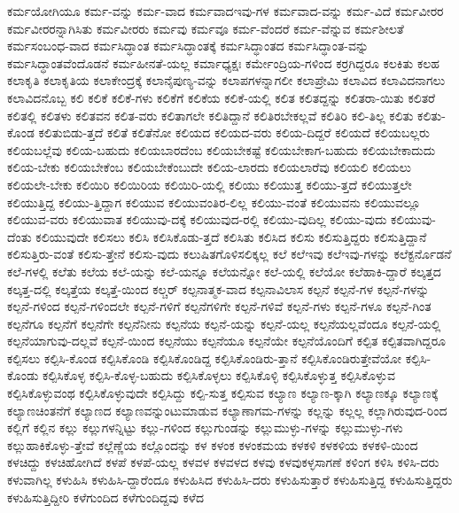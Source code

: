 {ಕರ್ಮಯೋಗಿಯೂ
ಕರ್ಮ-ವನ್ನು
ಕರ್ಮ-ವಾದ
ಕರ್ಮವಾದಇವು-ಗಳ
ಕರ್ಮವಾದ-ವನ್ನು
ಕರ್ಮ-ವಿದೆ
ಕರ್ಮವೀರರ
ಕರ್ಮವೀರರನ್ನಾಗಿಸಿತು
ಕರ್ಮವೀರರು
ಕರ್ಮವು
ಕರ್ಮವೂ
ಕರ್ಮ-ವೆಂದರೆ
ಕರ್ಮ-ವೆನ್ನುವ
ಕರ್ಮಶೀಲತೆ
ಕರ್ಮಸಂಬಂಧ-ವಾದ
ಕರ್ಮಸಿದ್ಧಾಂತ
ಕರ್ಮಸಿದ್ಧಾಂತಕ್ಕೆ
ಕರ್ಮಸಿದ್ಧಾಂತದ
ಕರ್ಮಸಿದ್ಧಾಂತ-ವನ್ನು
ಕರ್ಮಸಿದ್ಧಾಂತವೆಂದೊಡನೆ
ಕರ್ಮಹೀನತೆ-ಯಲ್ಲ
ಕರ್ಮಾಧ್ಯಕ್ಷಃ
ಕರ್ಮೇಂದ್ರಿಯ-ಗಳಿಂದ
ಕರ್ರಗಿದ್ದರೂ
ಕಲಕಿತು
ಕಲಹ
ಕಲಾಕೃತಿ
ಕಲಾಕೃತಿಯ
ಕಲಾಕೇಂದ್ರಕ್ಕೆ
ಕಲಾನೈಪುಣ್ಯ-ವನ್ನು
ಕಲಾಪಗಳನ್ನಾಗಲೀ
ಕಲಾಪ್ರೇಮಿ
ಕಲಾವಿದ
ಕಲಾವಿದನಾಗಲು
ಕಲಾವಿದನೊಬ್ಬ
ಕಲಿ
ಕಲಿಕೆ
ಕಲಿಕೆ-ಗಳು
ಕಲಿಕೆಗೆ
ಕಲಿಕೆಯ
ಕಲಿಕೆ-ಯಲ್ಲಿ
ಕಲಿತ
ಕಲಿತದ್ದನ್ನು
ಕಲಿತರಾ-ಯಿತು
ಕಲಿತರೆ
ಕಲಿತಲ್ಲಿ
ಕಲಿತಳು
ಕಲಿತವನ
ಕಲಿತ-ವರು
ಕಲಿತಾಗಲೇ
ಕಲಿತಿದ್ದಾನೆ
ಕಲಿತಿರಬೇಕಲ್ಲವೆ
ಕಲಿತಿರಿ
ಕಲಿ-ತಿಲ್ಲ
ಕಲಿತು
ಕಲಿತು-ಕೊಂಡ
ಕಲಿತುಬಿಡು-ತ್ತದೆ
ಕಲಿತೆ
ಕಲಿತೆನೋ
ಕಲಿಯದ
ಕಲಿಯದ-ವರು
ಕಲಿಯ-ದಿದ್ದರೆ
ಕಲಿಯದೆ
ಕಲಿಯಬಲ್ಲರು
ಕಲಿಯಬಲ್ಲೆವು
ಕಲಿಯ-ಬಹುದು
ಕಲಿಯಬಾರದೆಂಬ
ಕಲಿಯಬೇಕಷ್ಟೆ
ಕಲಿಯಬೇಕಾಗ-ಬಹುದು
ಕಲಿಯಬೇಕಾದುದು
ಕಲಿಯ-ಬೇಕು
ಕಲಿಯಬೇಕೆಂಬ
ಕಲಿಯಬೇಕೆಂಬುದೇ
ಕಲಿಯ-ಲಾರದು
ಕಲಿಯಲಾರೆವು
ಕಲಿಯಲಿ
ಕಲಿಯಲು
ಕಲಿಯಲೇ-ಬೇಕು
ಕಲಿಯಿರಿ
ಕಲಿಯಿರಿಯ
ಕಲಿಯಿರಿ-ಯಲ್ಲಿ
ಕಲಿಯು
ಕಲಿಯುತ್ತ
ಕಲಿಯು-ತ್ತದೆ
ಕಲಿಯುತ್ತಲೇ
ಕಲಿಯುತ್ತಿದ್ದ
ಕಲಿಯು-ತ್ತಿದ್ದಾಗ
ಕಲಿಯುವ
ಕಲಿಯುವಂತಿರ-ಲಿಲ್ಲ
ಕಲಿಯು-ವಂತೆ
ಕಲಿಯುವನು
ಕಲಿಯುವಲ್ಲೂ
ಕಲಿಯುವ-ವರು
ಕಲಿಯುವಾತ
ಕಲಿಯುವು-ದಕ್ಕೆ
ಕಲಿಯುವುದ-ರಲ್ಲಿ
ಕಲಿಯು-ವುದಿಲ್ಲ
ಕಲಿಯು-ವುದು
ಕಲಿಯುವು-ದೆಂತು
ಕಲಿಯುವುದೇ
ಕಲಿಸಲು
ಕಲಿಸಿ
ಕಲಿಸಿಕೊಡು-ತ್ತದೆ
ಕಲಿಸಿತು
ಕಲಿಸಿದ
ಕಲಿಸು
ಕಲಿಸುತ್ತಿದ್ದರು
ಕಲಿಸುತ್ತಿದ್ದಾನೆ
ಕಲಿಸುತ್ತಿರು-ವಂತೆ
ಕಲಿಸು-ತ್ತೇನೆ
ಕಲಿಸು-ವುದು
ಕಲುಷಿತಗೊಳಿಸಲಿಕ್ಕಲ್ಲ
ಕಲೆ
ಕಲೆಇವು
ಕಲೆಇವು-ಗಳನ್ನು
ಕಲೆಕ್ಟರ್ನೊಡನೆ
ಕಲೆ-ಗಳಲ್ಲಿ
ಕಲೆತು
ಕಲೆಯ
ಕಲೆ-ಯನ್ನು
ಕಲೆ-ಯನ್ನೂ
ಕಲೆಯನ್ನೋ
ಕಲೆ-ಯಲ್ಲಿ
ಕಲೆಯೋ
ಕಲೆಹಾಕಿ-ದ್ದಾರೆ
ಕಲ್ಕತ್ತದ
ಕಲ್ಕತ್ತ-ದಲ್ಲಿ
ಕಲ್ಕತ್ತೆಯ
ಕಲ್ಕತ್ತೆ-ಯಿಂದ
ಕಲ್ಚರ್
ಕಲ್ಪನಾತ್ಮಕ-ವಾದ
ಕಲ್ಪನಾವಿಲಾಸ
ಕಲ್ಪನೆ
ಕಲ್ಪನೆ-ಗಳ
ಕಲ್ಪನೆ-ಗಳನ್ನು
ಕಲ್ಪನೆ-ಗಳಿಂದ
ಕಲ್ಪನೆ-ಗಳಿಂದಲೇ
ಕಲ್ಪನೆ-ಗಳಿಗೆ
ಕಲ್ಪನೆಗಳಿಗೇ
ಕಲ್ಪನೆ-ಗಳಿವೆ
ಕಲ್ಪನೆ-ಗಳು
ಕಲ್ಪನೆ-ಗಳೂ
ಕಲ್ಪನೆ-ಗಿಂತ
ಕಲ್ಪನೆಗೂ
ಕಲ್ಪನೆಗೆ
ಕಲ್ಪನೆಗೇ
ಕಲ್ಪನೆನೀನು
ಕಲ್ಪನೆಯ
ಕಲ್ಪನೆ-ಯನ್ನು
ಕಲ್ಪನೆ-ಯಲ್ಲ
ಕಲ್ಪನೆಯಲ್ಲವೆಂದೂ
ಕಲ್ಪನೆ-ಯಲ್ಲಿ
ಕಲ್ಪನೆಯಾಗುವು-ದಲ್ಲವೆ
ಕಲ್ಪನೆ-ಯಿಂದ
ಕಲ್ಪನೆಯು
ಕಲ್ಪನೆಯೂ
ಕಲ್ಪನೆಯೇ
ಕಲ್ಪನೆಯೊಂದಿಗೆ
ಕಲ್ಪಿತ
ಕಲ್ಪಿತವಾಗಿದ್ದರೂ
ಕಲ್ಪಿಸಲು
ಕಲ್ಪಿಸಿ-ಕೊಂಡ
ಕಲ್ಪಿಸಿಕೊಂಡಿ
ಕಲ್ಪಿಸಿಕೊಂಡಿದ್ದ
ಕಲ್ಪಿಸಿಕೊಂಡಿರು-ತ್ತಾನೆ
ಕಲ್ಪಿಸಿಕೊಂಡಿರುತ್ತೇವೆಯೋ
ಕಲ್ಪಿಸಿ-ಕೊಂಡು
ಕಲ್ಪಿಸಿಕೊಳ್ಳ
ಕಲ್ಪಿಸಿ-ಕೊಳ್ಳ-ಬಹುದು
ಕಲ್ಪಿಸಿಕೊಳ್ಳಲು
ಕಲ್ಪಿಸಿಕೊಳ್ಳಿ
ಕಲ್ಪಿಸಿಕೊಳ್ಳುತ್ತ
ಕಲ್ಪಿಸಿಕೊಳ್ಳುವ
ಕಲ್ಪಿಸಿಕೊಳ್ಳುವಂಥ
ಕಲ್ಪಿಸಿಕೊಳ್ಳುವುದೇ
ಕಲ್ಪಿಸಿದ್ದು
ಕಲ್ಪಿ-ಸುತ್ತ
ಕಲ್ಪಿಸುವ
ಕಲ್ಯಾಣ
ಕಲ್ಯಾಣ-ಕ್ಕಾಗಿ
ಕಲ್ಯಾಣಕ್ಕೂ
ಕಲ್ಯಾಣಕ್ಕೆ
ಕಲ್ಯಾಣಚಿಂತನೆಗೆ
ಕಲ್ಯಾಣದ
ಕಲ್ಯಾಣವನ್ನುಂಟುಮಾಡುವ
ಕಲ್ಯಾಣಾಗಮ-ಗಳನ್ನು
ಕಲ್ಲನ್ನು
ಕಲ್ಲಲ್ಲ
ಕಲ್ಲಾಗಿರುವುದ-ರಿಂದ
ಕಲ್ಲಿಗೆ
ಕಲ್ಲಿನ
ಕಲ್ಲು
ಕಲ್ಲುಗಳನ್ನಿಟ್ಟು
ಕಲ್ಲು-ಗಳಿಂದ
ಕಲ್ಲುಗುಂಡನ್ನು
ಕಲ್ಲುಮುಳ್ಳು-ಗಳನ್ನು
ಕಲ್ಲುಮುಳ್ಳು-ಗಳು
ಕಲ್ಲುಹಾಕಿಕೊಳ್ಳು-ತ್ತೇವೆ
ಕಲ್ಲೆಣ್ಣೆಯ
ಕಲ್ಲೊಂದನ್ನು
ಕಳ
ಕಳಂಕ
ಕಳಂಕಮಯ
ಕಳಕಳಿ
ಕಳಕಳಿಯ
ಕಳಕಳಿ-ಯಿಂದ
ಕಳಚಿದ್ದು
ಕಳಚಿಹೋಗಿದೆ
ಕಳಪೆ
ಕಳಪೆ-ಯಲ್ಲ
ಕಳವಳ
ಕಳವಳದ
ಕಳವು
ಕಳವುಕಳ್ಳಸಾಗಣೆ
ಕಳಿಂಗ
ಕಳಿಸಿ
ಕಳಿಸಿ-ದರು
ಕಳುವಾಗಿಲ್ಲ
ಕಳುಹಿಸಿ
ಕಳುಹಿಸಿ-ದ್ದಾರೆಂದೂ
ಕಳುಹಿಸಿದ
ಕಳುಹಿಸಿ-ದರು
ಕಳುಹಿಸುತ್ತಾರೆ
ಕಳುಹಿಸುತ್ತಿದ್ದ
ಕಳುಹಿಸುತ್ತಿದ್ದರು
ಕಳುಹಿಸುತ್ತಿದ್ದೀರಿ
ಕಳೆಗುಂದಿದ
ಕಳೆಗುಂದಿದ್ದವು
ಕಳೆದ
}
